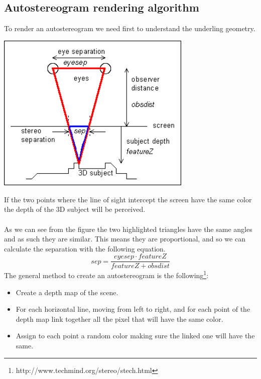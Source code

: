 \documentclass[12pt, a4paper]{article}
\begin{document}
\subsection{Autostereogram rendering algorithm}
To render an autostereogram we need first to understand the underling geometry.\\
\begin{center}
    \centering
    \includegraphics[width=0.7\textwidth]{img/geometry.png}
\end{center}
If the two points where the line of sight intercept the screen have the same color the depth of the 3D
subject will be perceived.\\\\
As we can see from the figure the two highlighted triangles have the same angles and as such they are similar.
This means they are proportional, and so we can calculate the separation with the following equation.
\[
sep = \frac{eyesep \cdot featureZ}{featureZ + obsdist}
\]
The general method to create an autostereogram is the following\footnote{http://www.techmind.org/stereo/stech.html}:
\begin{itemize}
    \item Create a depth map of the scene.
    \item For each horizontal line, moving from left to right, and for each point of the depth map link together all the pixel that will have the same color.
    \item Assign to each point a random color making sure the linked one will have the same.
\end{itemize}
\end{document}
